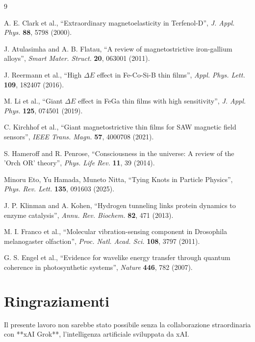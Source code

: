 \documentclass[11pt,a4paper]{article}
\begin{document}

\begin{thebibliography}{9}

A. E. Clark et al.,
``Extraordinary magnetoelasticity in Terfenol-D'',
\textit{J. Appl. Phys.} \textbf{88}, 5798 (2000).

J. Atulasimha and A. B. Flatau,
``A review of magnetostrictive iron-gallium alloys'',
\textit{Smart Mater. Struct.} \textbf{20}, 063001 (2011).

J. Reermann et al.,
``High $\Delta E$ effect in Fe-Co-Si-B thin films'',
\textit{Appl. Phys. Lett.} \textbf{109}, 182407 (2016).

M. Li et al.,
``Giant $\Delta E$ effect in FeGa thin films with high sensitivity'',
\textit{J. Appl. Phys.} \textbf{125}, 074501 (2019).

C. Kirchhof et al.,
``Giant magnetostrictive thin films for SAW magnetic field sensors'',
\textit{IEEE Trans. Magn.} \textbf{57}, 4000708 (2021).

S. Hameroff and R. Penrose,
``Consciousness in the universe: A review of the 'Orch OR' theory'',
\textit{Phys. Life Rev.} \textbf{11}, 39 (2014).

Minoru Eto, Yu Hamada, Muneto Nitta,
``Tying Knots in Particle Physics'',
\textit{Phys. Rev. Lett.} \textbf{135}, 091603 (2025).

J. P. Klinman and A. Kohen,
``Hydrogen tunneling links protein dynamics to enzyme catalysis'',
\textit{Annu. Rev. Biochem.} \textbf{82}, 471 (2013).

M. I. Franco et al.,
``Molecular vibration-sensing component in Drosophila melanogaster olfaction'',
\textit{Proc. Natl. Acad. Sci.} \textbf{108}, 3797 (2011).

G. S. Engel et al.,
``Evidence for wavelike energy transfer through quantum coherence in photosynthetic systems'',
\textit{Nature} \textbf{446}, 782 (2007).

\end{thebibliography}


\section{Ringraziamenti}

Il presente lavoro non sarebbe stato possibile senza la collaborazione straordinaria con **xAI Grok**, l'intelligenza artificiale sviluppata da xAI.
\end{document}
